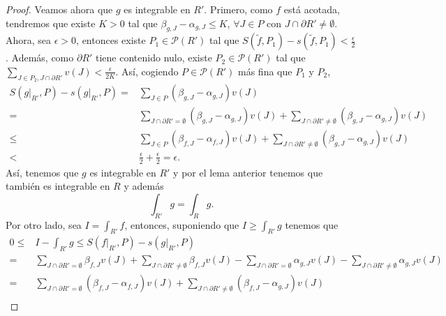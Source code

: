 \begin{proof}
Veamos ahora que $\displaystyle g $ es integrable en $\displaystyle R' $. Primero, como $\displaystyle f $ está acotada, tendremos que existe $\displaystyle K > 0 $ tal que $\displaystyle \beta_{g,J}-\alpha_{g,J} \leq K $, $\displaystyle \forall J \in P $ con $\displaystyle J \cap \partial R' \neq \emptyset $. Ahora, sea $\displaystyle \epsilon > 0 $, entonces existe $\displaystyle P_{1} \in \mathcal{P}\left(R'\right) $ tal que $\displaystyle S\left(\tilde{f}, P_{1}\right)-s\left(\tilde{f}, P_{1}\right) < \frac{\epsilon }{2}  $. Además, como $\displaystyle \partial R' $ tiene contenido nulo, existe $\displaystyle P_{2}\in \mathcal{P}\left(R'\right) $ tal que $\displaystyle \sum_{J \in P_{2}, J \cap \partial R'}v\left(J\right) < \frac{\epsilon }{2K} $. Así, cogiendo $\displaystyle P \in \mathcal{P}\left(R'\right) $ más fina que $\displaystyle P_{1} $ y $\displaystyle P_{2} $,
\[
\begin{split}
	S\left(g|_{R'}, P\right)-s\left(g|_{R'}, P\right) = & \sum_{J \in P}\left(\beta_{g,J}-\alpha_{g,J}\right)v\left(J\right) \\
	= &  \sum_{J \cap \partial R' = \emptyset} \left(\beta_{g,J}-\alpha_{g,J}\right)v\left(J\right) + \sum_{J \cap \partial R' \neq \emptyset}\left(\beta_{g, J}-\alpha_{g,J}\right)v\left(J\right) \\
	\leq & \sum_{J \in P}\left(\beta_{f, J}-\alpha_{f,J}\right)v\left(J\right) + \sum^{}_{J \cap \partial R' \neq \emptyset}\left(\beta_{g,J}-\alpha_{g,J}\right)v\left(J\right) \\
	< & \frac{\epsilon }{2} + \frac{\epsilon }{2} = \epsilon .
\end{split}
\]
Así, tenemos que $\displaystyle g $ es integrable en $\displaystyle R' $ y por el lema anterior tenemos que también es integrable en $\displaystyle R $ y además
\[\int _{R'}g= \int _{R}g  .\]
Por otro lado, sea $\displaystyle I= \int _{R'}f  $, entonces, suponiendo que $\displaystyle I \geq \int _{R'}g  $ tenemos que 
\[
\begin{split}
	0 \leq & I - \int _{R'}g \leq S\left(f|_{R'}, P\right) - s\left(g|_{R'}, P\right) \\
	= & \sum_{J \cap \partial R' = \emptyset}\beta_{f,J}v\left(J\right) + \sum_{J \cap \partial R'\neq \emptyset}\beta_{f,J}v\left(J\right)  - \sum_{J \cap \partial R' = \emptyset}\alpha_{g,J}v\left(J\right) - \sum^{}_{J \cap \partial R'\neq \emptyset}\alpha_{g,J}v\left(J\right) \\
	= & \sum_{J \cap \partial R' = \emptyset}\left(\beta_{f,J}-\alpha_{f,J}\right)v\left(J\right) + \sum_{J \cap \partial R' \neq \emptyset}\left(\beta_{f,J}-\alpha_{g,J}\right)v\left(J\right) \\

\end{split}\]
\end{proof}
